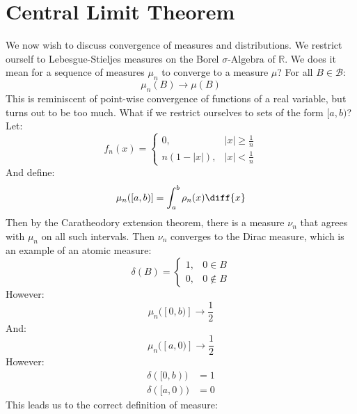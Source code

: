 \section{Central Limit Theorem}
    We now wish to discuss convergence of measures and distributions.
    We restrict ourself to Lebesgue-Stieljes measures on the Borel
    $\sigma\textrm{-Algebra}$ of $\mathbb{R}$. We does it mean for a
    sequence of measures $\mu_{n}$ to converge to a measure $\mu$? For
    all $B\in\mathcal{B}$:
    \begin{equation}
        \mu_{n}(B)\rightarrow\mu(B)
    \end{equation}
    This is reminiscent of point-wise convergence of functions of a real
    variable, but turns out to be too much. What if we restrict ourselves
    to sets of the form $[a,b)$? Let:
    \begin{equation}
        f_{n}(x)=
            \begin{cases}
                0,&|x|\geq\frac{1}{n}\\
                n(1-|x|),&|x|<\frac{1}{n}
            \end{cases}
    \end{equation}
    And define:
    \begin{equation}
        \mu_{n}([a,b)]=\int_{a}^{b}\rho_{n}(x)\diff{x}
    \end{equation}
    Then by the Caratheodory extension theorem, there is a
    measure $\nu_{n}$ that agrees with $\mu_{n}$ on all
    such intervals. Then $\nu_{n}$ converges to the
    Dirac measure, which is an example of an atomic measure:
    \begin{equation}
        \delta(B)=
            \begin{cases}
                1,&0\in{B}\\
                0,&0\notin{B}
            \end{cases}
    \end{equation}
    However:
    \begin{equation}
        \mu_{n}([0,b)]\rightarrow\frac{1}{2}
    \end{equation}
    And:
    \begin{equation}
        \mu_{n}([a,0)]\rightarrow\frac{1}{2}
    \end{equation}
    However:
    \begin{align}
        \delta([0,b))&=1\\
        \delta([a,0))&=0
    \end{align}
    This leads us to the correct definition of measure:
